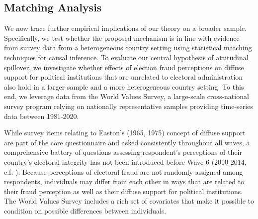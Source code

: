 \documentclass[11pt, ngerman,english,a4]{article}
\begin{document}
\subsection*{Matching Analysis}
We now trace further empirical implications of our theory on a broader sample. Specifically, we test whether the proposed mechanism is in line with evidence from survey data from a heterogeneous country setting using statistical matching techniques for causal inference. To evaluate our central hypothesis of attitudinal spillover, we investigate whether effects of election fraud perceptions on diffuse support for political institutions that are unrelated to electoral administration also hold in a larger sample and a more heterogeneous country setting. To this end, we leverage data from the World Values Survey, a large-scale cross-national survey program relying on nationally representative samples providing time-series data between 1981-2020. 

While survey items relating to Easton's (1965, 1975) concept of diffuse support are part of the core questionnaire and asked consistently throughout all waves, a comprehensive battery of questions assessing respondent's perceptions of their country's electoral integrity has not been introduced before Wave 6 (2010-2014, c.f. \citealt{Norris2014}). Because perceptions of electoral fraud are not randomly assigned among respondents, individuals may differ from each other in ways that are related to their fraud perception as well as their diffuse support for political institutions. The World Values Survey includes a rich set of covariates that make it possible to condition on possible differences between individuals. 
\end{document}

